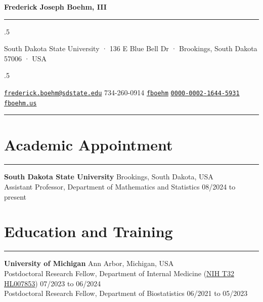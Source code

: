 \documentclass[
  10pt,
]
{article}
\begin{document}
\centerline{\huge \bf Frederick Joseph Boehm, III}

\vspace{2 mm}

\hrule

\vspace{2 mm}


\moveleft.5\hoffset\centerline{South Dakota State University · 136 E
Blue Bell Dr · Brookings, South Dakota 57006 · USA}
\moveleft.5\hoffset\centerline{ \faEnvelope \hspace{1 mm} \href{mailto:}{\tt frederick.boehm@sdstate.edu} \hspace{1 mm}  \faPhone \hspace{1 mm}  734-260-0914  \hspace{1 mm}  \faGithub \hspace{1 mm} \href{http://github.com/fboehm}{\tt fboehm} \hspace{1 mm}      \hspace{.5 mm} \href{https://orcid.org/0000-0002-1644-5931}{\tt 0000-0002-1644-5931} \hspace{1 mm}  \faGlobe \hspace{1 mm} \href{http://fboehm.us}{\tt fboehm.us}      }



\vspace{2 mm}

\hrule



\section{Academic Appointment}\label{academic-appointment}

\hrule

\textbf{South Dakota State University} \hfill Brookings, South Dakota,
USA\\
Assistant Professor, Department of Mathematics and Statistics
\hfill 08/2024 to present

\section{Education and Training}\label{education-and-training}

\hrule

\textbf{University of Michigan} \hfill Ann Arbor, Michigan, USA\\
Postdoctoral Research Fellow, Department of Internal Medicine
(\href{https://reporter.nih.gov/search/edYVbhxf0Uu_nQ9-JqHDJA/project-details/10576923}{NIH
T32 HL007853}) \hfill 07/2023 to 06/2024\\
Postdoctoral Research Fellow, Department of Biostatistics \hfill 06/2021
to 05/2023
\end{document}

